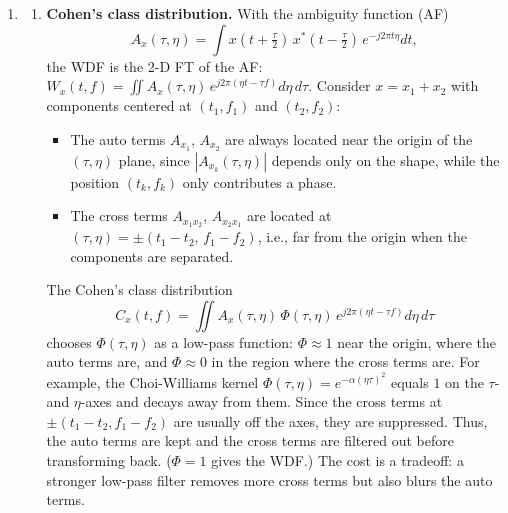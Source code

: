 \documentclass[12pt,a4paper]{article}
\begin{document}
\begin{enumerate}
\noindent Therefore, (c), (d), and (e) have the cross-term problem.
\item
\begin{enumerate}[label=(\alph*)]
  \item \textbf{Cohen's class distribution.} With the ambiguity function (AF)
  \[
  A_x(\tau,\eta)=\int x(t+\tfrac\tau2)\,x^*(t-\tfrac\tau2)\,e^{-j2\pi t\eta}dt,
  \]
  the WDF is the 2-D FT of the AF: $W_x(t,f)=\iint A_x(\tau,\eta)\,e^{j2\pi(\eta t-\tau f)}d\eta\,d\tau$. Consider $x=x_1+x_2$ with components centered at $(t_1,f_1)$ and $(t_2,f_2)$:
  \begin{itemize}
    \item The auto terms $A_{x_1}$, $A_{x_2}$ are always located near the origin of the $(\tau,\eta)$ plane, since $|A_{x_k}(\tau,\eta)|$ depends only on the shape, while the position $(t_k,f_k)$ only contributes a phase.
    \item The cross terms $A_{x_1x_2}$, $A_{x_2x_1}$ are located at $(\tau,\eta)=\pm(t_1-t_2,\,f_1-f_2)$, i.e., far from the origin when the components are separated.
  \end{itemize}
  The Cohen's class distribution
  \[
  C_x(t,f)=\iint A_x(\tau,\eta)\,\Phi(\tau,\eta)\,e^{j2\pi(\eta t-\tau f)}d\eta\,d\tau
  \]
  chooses $\Phi(\tau,\eta)$ as a low-pass function: $\Phi\approx1$ near the origin, where the auto terms are, and $\Phi\approx0$ in the region where the cross terms are. For example, the Choi-Williams kernel $\Phi(\tau,\eta)=e^{-\alpha(\eta\tau)^2}$ equals $1$ on the $\tau$- and $\eta$-axes and decays away from them. Since the cross terms at $\pm(t_1-t_2,f_1-f_2)$ are usually off the axes, they are suppressed. Thus, the auto terms are kept and the cross terms are filtered out before transforming back. ($\Phi=1$ gives the WDF.) The cost is a tradeoff: a stronger low-pass filter removes more cross terms but also blurs the auto terms.


\end{enumerate}
\end{enumerate}
\end{document}
